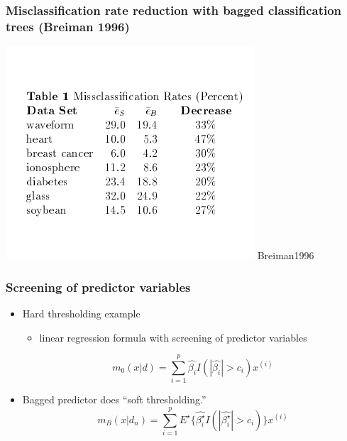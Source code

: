 \documentclass[bigger]{beamer}
\begin{document}
\begin{frame}
\frametitle{Misclassification rate reduction with bagged classification trees (Breiman 1996)}
\label{sec-1-3-3}

\includegraphics[width=.9\linewidth]{./Btable1.png}
Breiman1996
\end{frame}
\begin{frame}
\frametitle{Screening of predictor variables}
\label{sec-1-3-4}
\begin{itemize}

\item Hard thresholding example
\label{sec-1-3-4-1}%
\begin{itemize}
\item linear regression formula with screening of predictor variables
\end{itemize}
$$m_0(x|d) = \sum_{i=1}^{p} \hat{\beta_i}
I(|\hat{\beta_i}|>c_i)x^{(i)}$$


\item Bagged predictor does ``soft thresholding.''\\
\label{sec-1-3-4-2}%
$$m_B(x|d_n) = \sum_{i=1}^{p} E^{\star}\{\hat{\beta^{\star}_i} I(|\hat{\beta^{\star}_i}|>c_i)\}x^{(i)}$$

\end{itemize} %
\end{frame}
\end{document}
